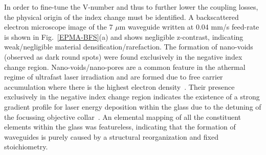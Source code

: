\documentclass[11pt]{article}
\begin{document}
In order to fine-tune the V-number and thus to further lower the coupling losses, the physical origin of the index change must be identified.  A backscattered electron microscope image of the 7 $\mu$m waveguide written at 0.04 mm/s feed-rate is shown in Fig.~\ref{EPMA-BFS}(a) and shows negligible z-contrast, indicating weak/negligible material densification/rarefaction. The formation of nano-voids (observed as dark round spots) were found exclusively in the negative index change region. Nano-voids/nano-pores are a common feature in the athermal regime of ultrafast laser irradiation and are formed due to free carrier accumulation where there is the highest electron density~\cite{Dai2016}. Their presence exclusively in the negative index change region indicates the existence of a strong gradient profile for laser energy deposition within the glass due to the detuning of the focussing objective collar~\cite{Fernandez_2015, Song2011}. An elemental mapping of all the constituent elements within the glass was featureless, indicating that the formation of waveguides is purely caused by a structural reorganization and fixed stoichiometry. 
\end{document}
